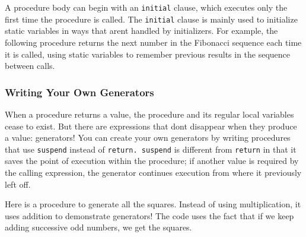 A procedure body can begin with an \texttt{initial} clause, which executes only the first time
the procedure is called. The \texttt{initial} clause is mainly used
to initialize static variables in ways that aren{\textquotesingle}t
handled by initializers. For example, the following procedure returns
the next number in the Fibonacci sequence each time it is
called, using static variables to remember previous results in the
sequence between calls.


\subsubsection[Writing Your Own Generators]{Writing Your Own Generators}

When a procedure returns a value, the procedure and its
regular local variables cease to exist. But there are expressions that
don{\textquotesingle}t disappear when they produce a value: generators!
You can create your own generators by writing procedures that use
\texttt{suspend} instead of \texttt{return. suspend} is different from
\texttt{return} in that it saves the point of execution within the
procedure; if another value is required by the calling expression, the
generator continues execution from where it previously left off.

Here is a procedure to generate all the squares. Instead of using
multiplication, it uses addition to demonstrate generators! The code
uses the fact that if we keep adding successive odd numbers, we get the
squares.


